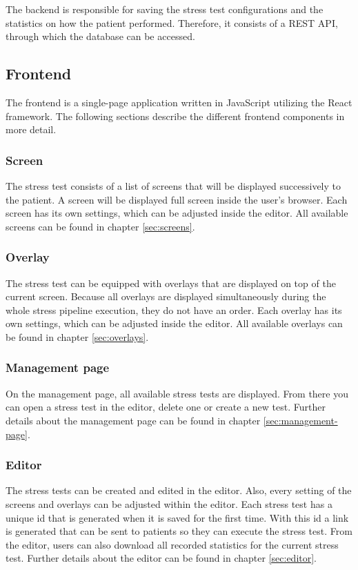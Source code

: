 The backend is responsible for saving the stress test configurations and the statistics on how the patient performed.
Therefore, it consists of a REST API, through which the database can be accessed.

\subsection{Frontend}
The frontend is a single-page application written in JavaScript utilizing the React framework. 
The following sections describe the different frontend components in more detail.

\subsubsection*{Screen}
The stress test consists of a list of screens that will be displayed successively to the patient. 
A screen will be displayed full screen inside the user's browser. 
Each screen has its own settings, which can be adjusted inside the editor. 
All available screens can be found in chapter \ref{sec:screens}.

\subsubsection*{Overlay}
The stress test can be equipped with overlays that are displayed on top of the current screen. 
Because all overlays are displayed simultaneously during the whole stress pipeline execution, they do not have an order. 
Each overlay has its own settings, which can be adjusted inside the editor.
All available overlays can be found in chapter \ref{sec:overlays}.

\subsubsection*{Management page}
On the management page, all available stress tests are displayed.
From there you can open a stress test in the editor, delete one or create a new test.
Further details about the management page can be found in chapter \ref{sec:management-page}.

\subsubsection*{Editor}
The stress tests can be created and edited in the editor.
Also, every setting of the screens and overlays can be adjusted within the editor.
Each stress test has a unique id that is generated when it is saved for the first time.
With this id a link is generated that can be sent to patients so they can execute the stress test.
From the editor, users can also download all recorded statistics for the current stress test.
Further details about the editor can be found in chapter \ref{sec:editor}.

